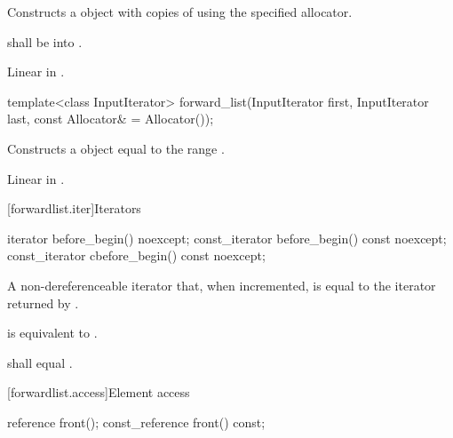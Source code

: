 \begin{itemdescr}
\pnum
\effects Constructs a  object with  copies of  using the specified allocator.

\pnum
\requires {} shall be  into .

\pnum
\complexity Linear in .
\end{itemdescr}

%
\begin{itemdecl}
template<class InputIterator>
  forward_list(InputIterator first, InputIterator last, const Allocator& = Allocator());
\end{itemdecl}

\begin{itemdescr}
\pnum
\effects Constructs a  object equal to the range .

\pnum
\complexity Linear in .
\end{itemdescr}

[forwardlist.iter]{Iterators}

%
%
\begin{itemdecl}
iterator before_begin() noexcept;
const_iterator before_begin() const noexcept;
const_iterator cbefore_begin() const noexcept;
\end{itemdecl}

\begin{itemdescr}
\pnum
\returns A non-dereferenceable iterator that, when incremented, is equal to the iterator
returned by .

\pnum
\effects {} is equivalent to
.

\pnum
\remarks {} shall equal .
\end{itemdescr}

[forwardlist.access]{Element access}

%
\begin{itemdecl}
reference front();
const_reference front() const;
\end{itemdecl}

\begin{itemdescr}
\pnum
\returns {}
\end{itemdescr}

